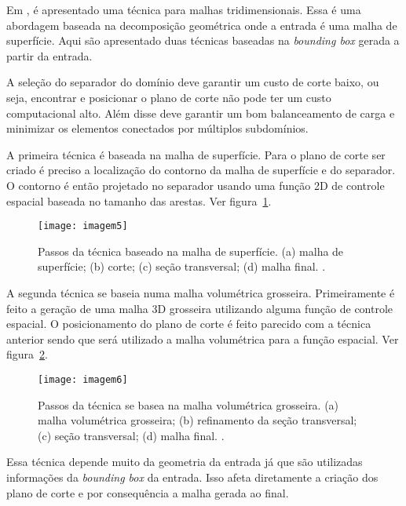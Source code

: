 Em \cite{bib:Glut08}, é apresentado uma técnica para malhas tridimensionais. Essa é uma abordagem baseada na decomposição geométrica onde a entrada é uma malha de superfície. Aqui são apresentado duas técnicas baseadas na \textit{bounding box} gerada a partir da entrada.

A seleção do separador do domínio deve garantir um custo de corte baixo, ou seja, encontrar e posicionar o plano de corte não pode ter um custo computacional alto. Além disse deve garantir um bom balanceamento de carga e minimizar os elementos conectados por múltiplos subdomínios.

A primeira técnica é baseada na malha de superfície. Para o plano de corte ser criado é preciso a localização do contorno da malha de superfície e do separador. O contorno é então projetado no separador usando uma função 2D de controle espacial baseada no tamanho das arestas. Ver figura~\ref{fig:imagem5}.

 \begin{figure}[htbp]
     \centering
     \texttt{[image: imagem5]}
     \caption{Passos da técnica baseado na malha de superfície. (a) malha de superfície; (b) corte; (c) seção transversal; (d) malha final. \cite{bib:Glut08}.}
     \label{fig:imagem5}
 \end{figure}

A segunda técnica se baseia numa malha volumétrica grosseira. Primeiramente é feito a geração de uma malha 3D grosseira utilizando alguma função de controle espacial. O posicionamento do plano de corte é feito parecido com a técnica anterior sendo que será utilizado a malha volumétrica para a função espacial. Ver figura~\ref{fig:imagem6}.

 \begin{figure}[htbp]
     \centering
     \texttt{[image: imagem6]}
     \caption{Passos da técnica se basea na malha volumétrica grosseira. (a) malha volumétrica grosseira; (b) refinamento da seção transversal; (c) seção transversal; (d) malha final. \cite{bib:Glut08}.}
     \label{fig:imagem6}
 \end{figure}

Essa técnica depende muito da geometria da entrada já que são utilizadas informações da \textit{bounding box} da entrada. Isso afeta diretamente a criação dos plano de corte e por consequência a malha gerada ao final.

